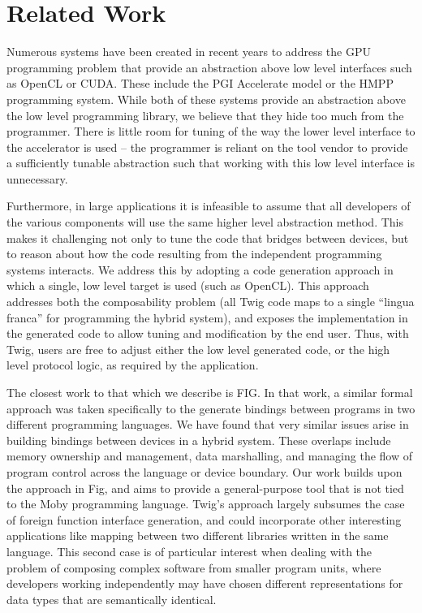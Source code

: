 
\section{Related Work}

Numerous systems have been created in recent years to address the GPU programming problem that provide an abstraction above low level interfaces such as OpenCL or CUDA. These include the PGI Accelerate model\cite{pgi-accelerate} or the HMPP programming system\cite{hmpp}. While both of these systems provide an abstraction above the low level programming library, we believe that they hide too much from the programmer. There is little room for tuning of the way the lower level interface to the accelerator is used -- the programmer is reliant on the tool vendor to provide a sufficiently tunable abstraction such that working with this low level interface is unnecessary.

Furthermore, in large applications it is infeasible to assume that all developers of the various components will use the same higher level abstraction method. This makes it challenging not only to tune the code that bridges between devices, but to reason about how the code resulting from the independent programming systems interacts. We address this by adopting a code generation approach in which a single, low level target is used (such as OpenCL). This approach addresses both the composability problem (all Twig code maps to a single ``lingua franca'' for programming the hybrid system), and exposes the implementation in the generated code to allow tuning and modification by the end user. Thus, with Twig, users are free to adjust either the low level generated code, or the high level protocol logic, as required by the application.

The closest work to that which we describe is FIG\cite{reppy06fig}. In that work, a similar formal approach was taken specifically to the generate bindings between programs in two different programming languages. We have found that very similar issues arise in building bindings between devices in a hybrid system. These overlaps include memory ownership and management, data marshalling, and managing the flow of program control across the language or device boundary. Our work builds upon the approach in Fig, and aims to provide a general-purpose tool that is not tied to the Moby programming language. Twig's approach largely subsumes the case of foreign function interface generation, and could incorporate other interesting applications like mapping between two different libraries written in the same language. This second case is of particular interest when dealing with the problem of composing complex software from smaller program units, where developers working independently may have chosen different representations for data types that are semantically identical.

